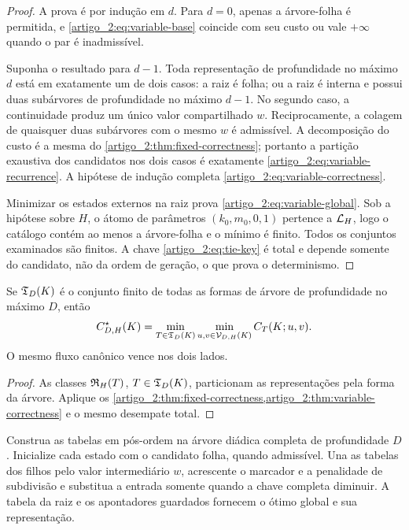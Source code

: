 \begin{proof}
A prova é por indução em $d$. Para $d=0$, apenas a árvore-folha é permitida,
e \eqref{artigo_2:eq:variable-base} coincide com seu custo ou vale $+\infty$ quando o
par é inadmissível.

Suponha o resultado para $d-1$. Toda representação de profundidade no máximo
$d$ está em exatamente um de dois casos: a raiz é folha; ou a raiz é interna
e possui duas subárvores de profundidade no máximo $d-1$. No segundo caso, a
continuidade produz um único valor compartilhado $w$. Reciprocamente, a
colagem de quaisquer duas subárvores com o mesmo $w$ é admissível. A
decomposição do custo é a mesma do \cref{artigo_2:thm:fixed-correctness}; portanto a
partição exaustiva dos candidatos nos dois casos é exatamente
\eqref{artigo_2:eq:variable-recurrence}. A hipótese de indução completa
\eqref{artigo_2:eq:variable-correctness}.

Minimizar os estados externos na raiz prova \eqref{artigo_2:eq:variable-global}. Sob a
hipótese sobre $H$, o átomo de parâmetros $(k_0,m_0,0,1)$ pertence a
$\mathcal{L}_H$, logo o catálogo contém ao menos a árvore-folha e o mínimo é
finito. Todos os conjuntos examinados são finitos. A chave
\eqref{artigo_2:eq:tie-key} é total e depende somente do candidato, não da ordem de
geração, o que prova o determinismo.
\end{proof}

\begin{corollary}\label{map:artigo_2:7.3}
\label{artigo_2:cor:shape-enumeration}
Se $\mathfrak{T}_D(K)$ é o conjunto finito de todas as formas de árvore de
profundidade no máximo $D$, então
\begin{equation}
 C_{D,H}^{\star}(K)
 =\min_{T\in\mathfrak{T}_D(K)}
   \min_{u,v\in\mathcal{V}_{D,H}(K)}C_T(K;u,v).
 \label{artigo_2:eq:shape-equivalence}
\end{equation}
O mesmo fluxo canônico vence nos dois lados.
\end{corollary}

\begin{proof}
As classes $\mathfrak{R}_H(T)$, $T\in\mathfrak{T}_D(K)$, particionam as
representações pela forma da árvore. Aplique os
\cref{artigo_2:thm:fixed-correctness,artigo_2:thm:variable-correctness} e o mesmo desempate
total.
\end{proof}

\begin{algorithm}\label{map:artigo_2:7.4}
\label{artigo_2:alg:variable-tree}
Construa as tabelas em pós-ordem na árvore diádica completa de profundidade
$D$. Inicialize cada estado com o candidato folha, quando admissível. Una as
tabelas dos filhos pelo valor intermediário $w$, acrescente o marcador e a
penalidade de subdivisão e substitua a entrada somente quando a chave completa
diminuir. A tabela da raiz e os apontadores guardados fornecem o ótimo global
e sua representação.
\end{algorithm}

